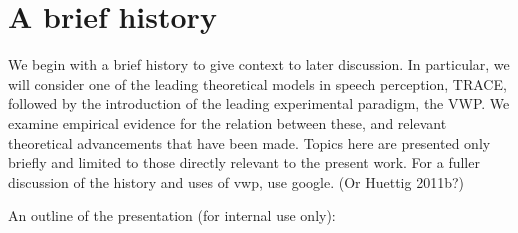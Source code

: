 \documentclass{article}
\begin{document}



\section{A brief history}
We begin with a brief history to give context to later discussion. In particular, we will consider one of the leading theoretical models in speech perception, TRACE, followed by the introduction of the leading experimental paradigm, the VWP. We examine empirical evidence for the relation between these, and relevant theoretical advancements that have been made. Topics here are presented only briefly and limited to those directly relevant to the present work. For a fuller discussion of the history and uses of vwp, use google. (Or Huettig 2011b?)

An outline of the presentation (for internal use only):
\end{document}
